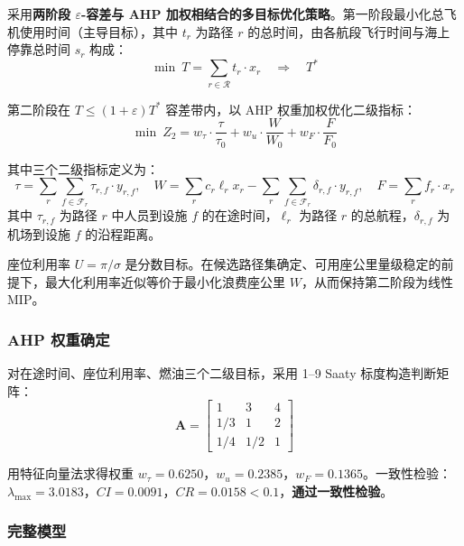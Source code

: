 \documentclass[withoutpreface]{cumcmthesis}
\begin{document}
采用\textbf{两阶段 $\varepsilon$-容差\cite{haimes1971}与 AHP 加权\cite{saaty1980}相结合的多目标优化策略}。第一阶段最小化总飞机使用时间（主导目标），其中 $t_r$ 为路径 $r$ 的总时间，由各航段飞行时间与海上停靠总时间 $s_r$ 构成：
\begin{equation}
\min \ T = \sum_{r \in \mathcal{R}} t_r \cdot x_r \quad \Rightarrow \quad T^*
\label{eq:q1_stage1}
\end{equation}

第二阶段在 $T \leq (1+\varepsilon) T^*$ 容差带内，以 AHP 权重加权优化二级指标：
\begin{equation}
\min \ Z_2 = w_\tau \cdot \frac{\tau}{\tau_0} + w_u \cdot \frac{W}{W_0} + w_F \cdot \frac{F}{F_0}
\label{eq:q1_stage2}
\end{equation}

其中三个二级指标定义为：
\begin{equation}
\tau = \sum_{r} \sum_{f \in \mathcal{F}_r} \tau_{r,f} \cdot y_{r,f}, \quad
W = \sum_{r} c_r \ell_r x_r - \sum_{r} \sum_{f \in \mathcal{F}_r} \delta_{r,f} \cdot y_{r,f}, \quad
F = \sum_{r} f_r \cdot x_r
\label{eq:q1_metrics}
\end{equation}
其中 $\tau_{r,f}$ 为路径 $r$ 中人员到设施 $f$ 的在途时间，$\ell_r$ 为路径 $r$ 的总航程，$\delta_{r,f}$ 为机场到设施 $f$ 的沿程距离。

座位利用率 $U = \pi / \sigma$ 是分数目标。在候选路径集确定、可用座公里量级稳定的前提下，最大化利用率近似等价于最小化浪费座公里 $W$，从而保持第二阶段为线性 MIP。

\subsubsection{AHP 权重确定}

对在途时间、座位利用率、燃油三个二级目标，采用 1--9 Saaty 标度\cite{saaty1980}构造判断矩阵：
\[
\mathbf{A} = \begin{bmatrix} 1 & 3 & 4 \\ 1/3 & 1 & 2 \\ 1/4 & 1/2 & 1 \end{bmatrix}
\]

用特征向量法求得权重 $w_\tau = 0.6250$，$w_u = 0.2385$，$w_F = 0.1365$。一致性检验：$\lambda_{\max} = 3.0183$，$CI = 0.0091$，$CR = 0.0158 < 0.1$，\textbf{通过一致性检验}。

\subsubsection{完整模型}
\end{document}
